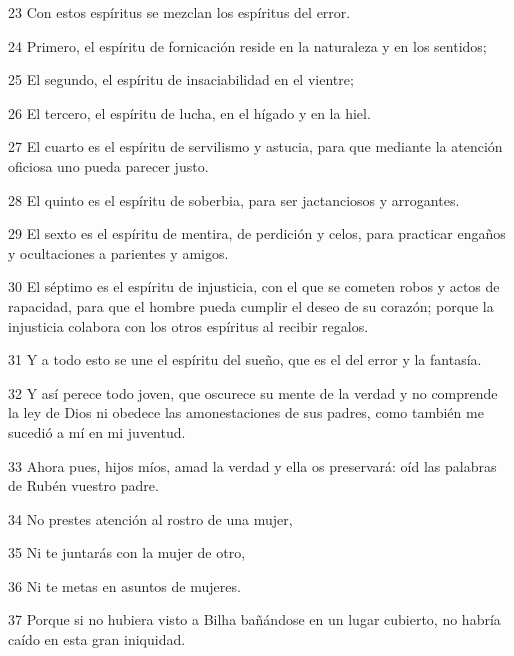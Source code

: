 \par 23 Con estos espíritus se mezclan los espíritus del error.

\par 24 Primero, el espíritu de fornicación reside en la naturaleza y en los sentidos;

\par 25 El segundo, el espíritu de insaciabilidad en el vientre;

\par 26 El tercero, el espíritu de lucha, en el hígado y en la hiel.

\par 27 El cuarto es el espíritu de servilismo y astucia, para que mediante la atención oficiosa uno pueda parecer justo.

\par 28 El quinto es el espíritu de soberbia, para ser jactanciosos y arrogantes.

\par 29 El sexto es el espíritu de mentira, de perdición y celos, para practicar engaños y ocultaciones a parientes y amigos.

\par 30 El séptimo es el espíritu de injusticia, con el que se cometen robos y actos de rapacidad, para que el hombre pueda cumplir el deseo de su corazón; porque la injusticia colabora con los otros espíritus al recibir regalos.

\par 31 Y a todo esto se une el espíritu del sueño, que es el del error y la fantasía.

\par 32 Y así perece todo joven, que oscurece su mente de la verdad y no comprende la ley de Dios ni obedece las amonestaciones de sus padres, como también me sucedió a mí en mi juventud.

\par 33 Ahora pues, hijos míos, amad la verdad y ella os preservará: oíd las palabras de Rubén vuestro padre.

\par 34 No prestes atención al rostro de una mujer,

\par 35 Ni te juntarás con la mujer de otro,

\par 36 Ni te metas en asuntos de mujeres.

\par 37 Porque si no hubiera visto a Bilha bañándose en un lugar cubierto, no habría caído en esta gran iniquidad.

